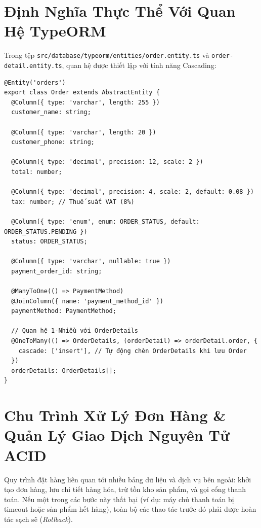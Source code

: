 \documentclass[12pt,a4paper,oneside]{book}
\begin{document}
\section{Định Nghĩa Thực Thể Với Quan Hệ TypeORM}
Trong tệp \texttt{src/database/typeorm/entities/order.entity.ts} và \texttt{order-detail.entity.ts}, quan hệ được thiết lập với tính năng Cascading:

\begin{codebox}
\begin{Verbatim}[fontsize=\small]
@Entity('orders')
export class Order extends AbstractEntity {
  @Column({ type: 'varchar', length: 255 })
  customer_name: string;

  @Column({ type: 'varchar', length: 20 })
  customer_phone: string;

  @Column({ type: 'decimal', precision: 12, scale: 2 })
  total: number;

  @Column({ type: 'decimal', precision: 4, scale: 2, default: 0.08 })
  tax: number; // Thuế suất VAT (8%)

  @Column({ type: 'enum', enum: ORDER_STATUS, default: ORDER_STATUS.PENDING })
  status: ORDER_STATUS;

  @Column({ type: 'varchar', nullable: true })
  payment_order_id: string;

  @ManyToOne(() => PaymentMethod)
  @JoinColumn({ name: 'payment_method_id' })
  paymentMethod: PaymentMethod;

  // Quan hệ 1-Nhiều với OrderDetails
  @OneToMany(() => OrderDetails, (orderDetail) => orderDetail.order, {
    cascade: ['insert'], // Tự động chèn OrderDetails khi lưu Order
  })
  orderDetails: OrderDetails[];
}
\end{Verbatim}
\end{codebox}

\section{Chu Trình Xử Lý Đơn Hàng \& Quản Lý Giao Dịch Nguyên Tử ACID}
Quy trình đặt hàng liên quan tới nhiều bảng dữ liệu và dịch vụ bên ngoài: khởi tạo đơn hàng, lưu chi tiết hàng hóa, trừ tồn kho sản phẩm, và gọi cổng thanh toán. Nếu một trong các bước này thất bại (ví dụ: máy chủ thanh toán bị timeout hoặc sản phẩm hết hàng), toàn bộ các thao tác trước đó phải được hoàn tác sạch sẽ (\textit{Rollback}).
\end{document}
